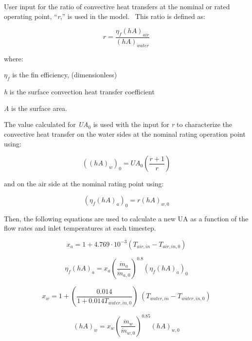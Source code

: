 User input for the ratio of convective heat transfers at the nominal or rated operating point, ``\emph{r},'' is used in the model.~ This ratio is defined as:

\begin{equation}
r = \frac{{{\eta_f}{{\left( {hA} \right)}_{air}}}}{{{{\left( {hA} \right)}_{water}}}}
\end{equation}

where:

\({\eta_f}\) is the fin efficiency, (dimensionless)

\emph{h} is the surface convection heat transfer coefficient

\emph{A} is the surface area.

The value calculated for \emph{UA}\(_{0}\) is used with the input for \emph{r} to characterize the convective heat transfer on the water sides at the nominal rating operation point using:

\begin{equation}
{\left( {{{\left( {hA} \right)}_w}} \right)_0} = U{A_0}\left( {\frac{{r + 1}}{r}} \right)
\end{equation}

and on the air side at the nominal rating point using:

\begin{equation}
{\left( {{\eta_f}{{\left( {hA} \right)}_a}} \right)_0} = r{\left( {hA} \right)_{w,0}}
\end{equation}

Then, the following equations are used to calculate a new UA as a function of the flow rates and inlet temperatures at each timestep.

\begin{equation}
{x_a} = 1 + 4.769\cdot {10^{ - 3}}\left( {{T_{air,in}} - {T_{air,in,0}}} \right)
\end{equation}

\begin{equation}
{\eta_f}{\left( {hA} \right)_a} = {x_a}{\left( {\frac{{{{\dot m}_a}}}{{{{\dot m}_{a,0}}}}} \right)^{0.8}}{\left( {{\eta_f}{{\left( {hA} \right)}_a}} \right)_0}
\end{equation}

\begin{equation}
{x_w} = 1 + \left( {\frac{{0.014}}{{1 + 0.014{T_{water,in,0}}}}} \right)\;\left( {{T_{water,in}} - {T_{water,in,0}}} \right)
\end{equation}

\begin{equation}
{\left( {hA} \right)_w} = {x_w}{\left( {\frac{{{{\dot m}_w}}}{{{{\dot m}_{w,0}}}}} \right)^{0.85}}{\left( {hA} \right)_{w,0}}
\end{equation}

